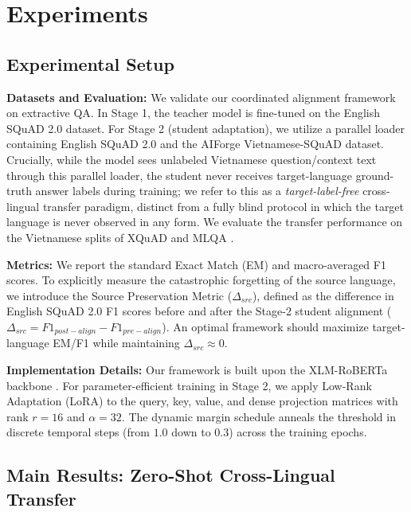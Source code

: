 \documentclass[11pt]{article}
\begin{document}
\section{Experiments}

\subsection{Experimental Setup}
\label{sec:setup}
\textbf{Datasets and Evaluation:} We validate our coordinated alignment framework on extractive QA. In Stage 1, the teacher model is fine-tuned on the English SQuAD 2.0 dataset. For Stage 2 (student adaptation), we utilize a parallel loader containing English SQuAD 2.0 and the AIForge Vietnamese-SQuAD dataset. Crucially, while the model sees unlabeled Vietnamese question/context text through this parallel loader, the student never receives target-language ground-truth answer labels during training; we refer to this as a \emph{target-label-free} cross-lingual transfer paradigm, distinct from a fully blind protocol in which the target language is never observed in any form. We evaluate the transfer performance on the Vietnamese splits of XQuAD \cite{artetxe-etal-2020-cross} and MLQA \cite{lewis-etal-2020-mlqa}. 

\textbf{Metrics:} We report the standard Exact Match (EM) and macro-averaged F1 scores. To explicitly measure the catastrophic forgetting of the source language, we introduce the Source Preservation Metric ($\Delta_{src}$), defined as the difference in English SQuAD 2.0 F1 scores before and after the Stage-2 student alignment ($\Delta_{src} = F1_{post-align} - F1_{pre-align}$). An optimal framework should maximize target-language EM/F1 while maintaining $\Delta_{src} \approx 0$.

\textbf{Implementation Details:} Our framework is built upon the XLM-RoBERTa backbone \cite{conneau-etal-2020-unsupervised}. For parameter-efficient training in Stage 2, we apply Low-Rank Adaptation (LoRA) \cite{hu2021loralowrankadaptationlarge} to the query, key, value, and dense projection matrices with rank $r=16$ and $\alpha=32$. The dynamic margin schedule anneals the threshold in discrete temporal steps (from $1.0$ down to $0.3$) across the training epochs. 

\subsection{Main Results: Zero-Shot Cross-Lingual Transfer}
\end{document}
